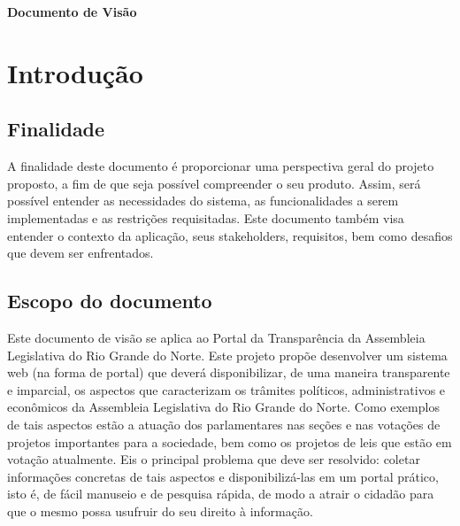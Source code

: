 \documentclass[12pt, a4paper]{article}
\begin{document}
    \tableofcontents


    \newpage

    \begin{center}
      \Large\textbf{Documento de Visão}
    \end{center}

    \section{Introdução}
        \subsection{Finalidade}
        A finalidade deste documento é proporcionar uma perspectiva geral do
        projeto proposto, a fim de que seja possível compreender o seu produto.
        Assim, será possível entender as necessidades do sistema, as
        funcionalidades a serem implementadas e as restrições requisitadas.
        Este documento também visa entender o contexto da aplicação, seus
        stakeholders, requisitos, bem como desafios que devem ser enfrentados.

        \subsection{Escopo do documento}
        Este documento de visão se aplica ao Portal da Transparência da Assembleia
        Legislativa do Rio Grande do Norte. Este projeto propõe desenvolver um sistema
        web (na forma de portal) que deverá disponibilizar, de uma maneira transparente
        e imparcial, os aspectos que caracterizam os trâmites políticos,
        administrativos e econômicos da Assembleia Legislativa do Rio Grande do Norte.
        Como exemplos de tais aspectos estão a atuação dos parlamentares nas seções e
        nas votações de projetos importantes para a sociedade, bem como os projetos de
        leis que estão em votação atualmente. Eis o principal problema que deve ser
        resolvido: coletar informações concretas de tais aspectos e disponibilizá-las
        em um portal prático, isto é, de fácil manuseio e de pesquisa rápida, de modo a
        atrair o cidadão para que o mesmo possa usufruir do seu direito à informação.
\end{document}
